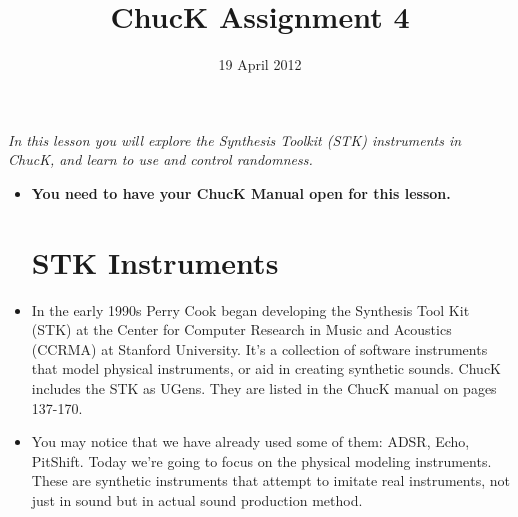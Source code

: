 \documentclass{article}
\title{ChucK Assignment 4}
\date{19 April 2012}
\begin{document}
\maketitle

\textsl{In this lesson you will explore the Synthesis Toolkit (STK) instruments in ChucK, and learn to use and control randomness.}\vspace{2mm}

\begin{itemize}

\item \textbf{You need to have your ChucK Manual open for this lesson.}

\section{STK Instruments}

\item In the early 1990s Perry Cook began developing the Synthesis Tool Kit (STK) at the Center for Computer Research in Music and Acoustics (CCRMA) at Stanford University. It's a collection of software instruments that model physical instruments, or aid in creating synthetic sounds. ChucK includes the STK as UGens. They are listed in the ChucK manual on pages 137-170.

\item You may notice that we have already used some of them: ADSR, Echo, PitShift. Today we're going to focus on the physical modeling instruments. These are synthetic instruments that attempt to imitate real instruments, not just in sound but in actual sound production method.

\end {itemize}
\end{document}
